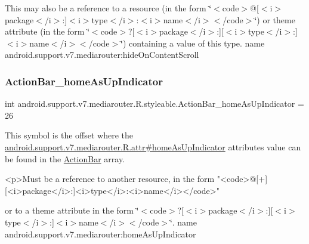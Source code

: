 This may also be a reference to a resource (in the form \char`\"{}$<$code$>$@\mbox{[}$<$i$>$package$<$/i$>$\+:\mbox{]}$<$i$>$type$<$/i$>$\+:$<$i$>$name$<$/i$>$$<$/code$>$\char`\"{}) or theme attribute (in the form \char`\"{}$<$code$>$?\mbox{[}$<$i$>$package$<$/i$>$\+:\mbox{]}\mbox{[}$<$i$>$type$<$/i$>$\+:\mbox{]}$<$i$>$name$<$/i$>$$<$/code$>$\char`\"{}) containing a value of this type.  name android.\+support.\+v7.\+mediarouter\+:hide\+On\+Content\+Scroll \mbox{\label{classandroid_1_1support_1_1v7_1_1mediarouter_1_1R_1_1styleable_ade721da752b0720b0d2e366f8abc084b}} 
\subsubsection{\texorpdfstring{Action\+Bar\+\_\+home\+As\+Up\+Indicator}{ActionBar\_homeAsUpIndicator}}
{\footnotesize\ttfamily int android.\+support.\+v7.\+mediarouter.\+R.\+styleable.\+Action\+Bar\+\_\+home\+As\+Up\+Indicator = 26\hspace{0.3cm}{\ttfamily [static]}}

This symbol is the offset where the \hyperlink{classandroid_1_1support_1_1v7_1_1mediarouter_1_1R_1_1attr_aef82f0702653b8305457086c422d866c}{android.\+support.\+v7.\+mediarouter.\+R.\+attr\#home\+As\+Up\+Indicator} attribute\textquotesingle{}s value can be found in the \hyperlink{classandroid_1_1support_1_1v7_1_1mediarouter_1_1R_1_1styleable_adc4d3c0d096085367f12d025007aa53f}{Action\+Bar} array.

\begin{DoxyVerb}      <p>Must be a reference to another resource, in the form "<code>@[+][<i>package</i>:]<i>type</i>:<i>name</i></code>"
\end{DoxyVerb}
 or to a theme attribute in the form \char`\"{}$<$code$>$?\mbox{[}$<$i$>$package$<$/i$>$\+:\mbox{]}\mbox{[}$<$i$>$type$<$/i$>$\+:\mbox{]}$<$i$>$name$<$/i$>$$<$/code$>$\char`\"{}.  name android.\+support.\+v7.\+mediarouter\+:home\+As\+Up\+Indicator \mbox{\label{classandroid_1_1support_1_1v7_1_1mediarouter_1_1R_1_1styleable_a20714fb94d0bf9ede79ff6e4154903da}} 
